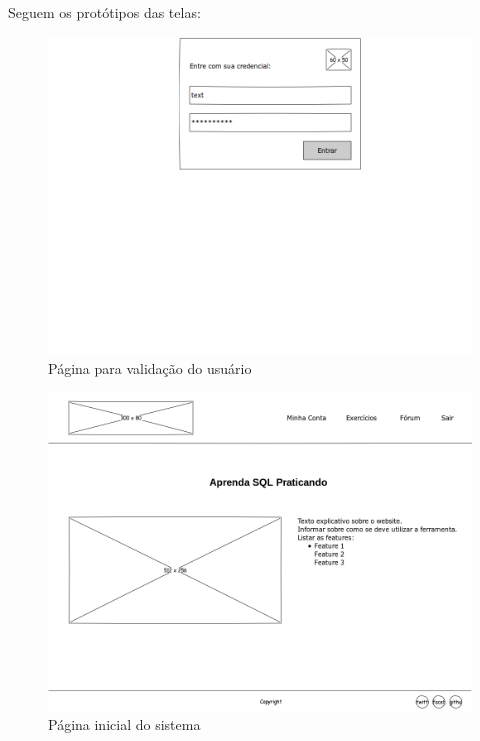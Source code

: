 \documentclass[graduacao,brazil]{ThesisPUC}
\begin{document}
Seguem os prot\'{o}tipos das telas:

\begin{figure}[H]
    \centering
    \includegraphics[width=\linewidth]{Imagens/LoginPage.png}
    \caption{P\'{a}gina para valida\c{c}\~{a}o do usu\'{a}rio}
\end{figure}

\begin{figure}[H]
    \centering
    \includegraphics[width=\linewidth]{Imagens/WelcomePage.png}
    \caption{P\'{a}gina inicial do sistema}
\end{figure}
\end{document}
